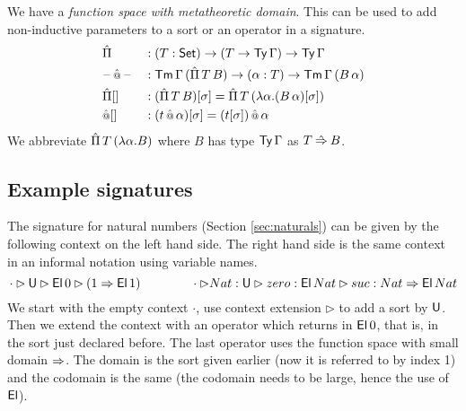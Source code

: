 \documentclass[acmsmall,review]{acmart}\settopmatter{printfolios=true,printccs=false,printacmref=false}
\begin{document}
We have a \emph{function space with metatheoretic domain}. This can be
used to add non-inductive parameters to a sort or an operator in a
signature.
\begin{alignat*}{5}
  & \hat{\Pi} && : (T:\mathsf{Set})\rightarrow(T\rightarrow\mathsf{Ty}\,\Gamma)\rightarrow\mathsf{Ty}\,\Gamma \\
  & \mathord{\hspace{1pt}\text{--}\hspace{1pt}}\mathop{\hat{\mathop{{\scriptstyle @}}}} \mathord{\hspace{1pt}\text{--}\hspace{1pt}} && : \mathsf{Tm}\,\Gamma\,(\hat{\Pi}\,T\,B)\rightarrow(\alpha:T) \rightarrow\mathsf{Tm}\,\Gamma\,(B\,\alpha) \\
  & {\hat{\Pi}[]} && : (\hat{\Pi}\,T\,B)[\sigma] = \hat{\Pi}\,T\,(\lambda \alpha.(B\,\alpha)[\sigma]) \\
  & {\mathop{\hat{\mathop{{\scriptstyle @}}}}[]} && : (t\mathop{\hat{\mathop{{\scriptstyle @}}}}\alpha)[\sigma] = (t[\sigma])\mathop{\mathop{\hat{\mathop{{\scriptstyle @}}}}}\alpha
\end{alignat*}
We abbreviate $\hat{\Pi}\,T\,(\lambda\alpha.B)$ where $B$ has type
$\mathsf{Ty}\,\Gamma$ as $T\mathbin{\hat{\Rightarrow}} B$.

\subsection{Example signatures}

The signature for natural numbers (Section \ref{sec:naturals}) can be
given by the following context on the left hand side. The right hand
side is the same context in an informal notation using variable names.
\[
\cdot\rhd\mathsf{U}\rhd\mathsf{El}\,0\rhd (1\Rightarrow \mathsf{El}\,1) \hspace{4em} \cdot\rhd Nat:\mathsf{U}\rhd zero:\mathsf{El}\,Nat\rhd suc:Nat\Rightarrow\mathsf{El}\,Nat
\]
We start with the empty context $\cdot$, use context extension $\rhd$
to add a sort by $\mathsf{U}$. Then we extend the context with an operator
which returns in $\mathsf{El}\,0$, that is, in the sort just declared
before. The last operator uses the function space with small domain
$\Rightarrow$. The domain is the sort given earlier (now it is referred to by
index 1) and the codomain is the same (the codomain needs to be large,
hence the use of $\mathsf{El}$).
\end{document}
